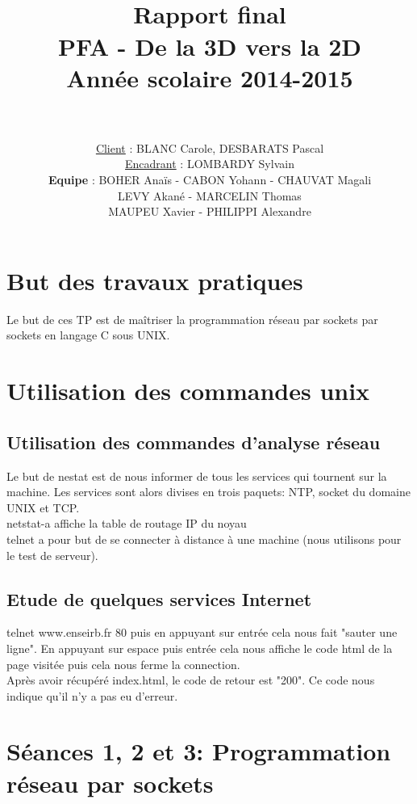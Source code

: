 \documentclass[paper=a4, fontsize=12pt]{article}
\title{
  \usefont{OT1}{bch}{b}{n}
  \horrule{1.5pt} \\[0.5cm]	
  \Huge \textbf{Rapport final} \\ [10pt]
  \Huge PFA - De la 3D vers la 2D \\ [15pt]
  \LARGE Année scolaire 2014-2015 \\ 
  \horrule{1.5pt} \\[0.5cm]
}
\author{
  \huge \underline{Client} : \LARGE BLANC Carole, DESBARATS Pascal\\ [10pt] 
  \huge \underline{Encadrant} : \LARGE LOMBARDY Sylvain\\[20pt]
  \normalfont 							
  \huge \textbf{Equipe} : \Large BOHER Anaïs - CABON Yohann - CHAUVAT Magali \\[5pt]
  \Large LEVY Akané - MARCELIN Thomas \\[5pt]
  \Large MAUPEU Xavier - PHILIPPI Alexandre \\[10pt]		\normalsize
}
\date{}
\numberwithin{equation}{section}		%
\numberwithin{figure}{section}			%
\numberwithin{table}{section}				%
\begin{document}
\maketitle
\newpage

\tableofcontents

\newpage
\section{But des travaux pratiques}
Le but de ces TP est de maîtriser la programmation réseau par sockets par sockets en langage C sous UNIX.
\section{Utilisation des commandes unix}
\subsection{Utilisation des commandes d'analyse réseau}
Le but de nestat est de nous informer de tous les services qui tournent sur la machine. Les services sont alors divises en trois paquets: NTP, socket du domaine UNIX et TCP.
\\netstat-a affiche la table de routage IP du noyau
\\telnet a pour but de se connecter à distance à une machine (nous utilisons pour le test de serveur).
\subsection{Etude de quelques services Internet}
telnet www.enseirb.fr 80 puis en appuyant sur entrée cela nous fait "sauter une ligne". En appuyant sur espace puis entrée cela nous affiche le code html de la page visitée puis cela nous ferme la connection.
\\Après avoir récupéré index.html, le code de retour est "200". Ce code nous indique qu'il n'y a pas eu d'erreur.
\section{Séances 1, 2 et 3: Programmation réseau par sockets}
\end{document}
